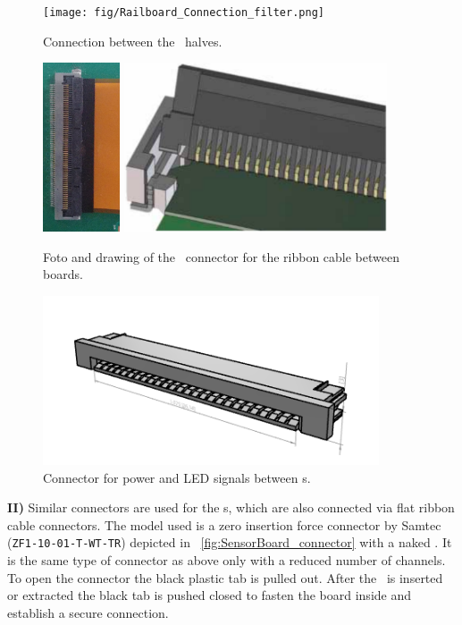 \documentclass[../BTOF_summary.tex]{subfiles}
\begin{document}
\begin{figure}[htbp]
	\centering
	\texttt{[image: fig/Railboard\_Connection\_filter.png]}
	\caption{Connection between the \railboard\ halves.}
	\label{fig:Railboard_connection}
\end{figure}

\begin{figure}[htbp]
	\centering
	\includegraphics[height=5cm]{fig/LargeConnector_cable_crop.jpg}
	\includegraphics[height=5cm]{fig/hirose_connector_drawing.png}
	\caption{Foto and drawing of the \railboard\ connector for the ribbon cable between boards.}
	\label{fig:Railboard_connector}
\end{figure}

\begin{figure}[htbp]
	\centering
	\includegraphics[height=5cm]{fig/Connector_ZF1-25-01.png}
	\caption{Connector for power and LED signals between \railboard s.}
	\label{fig:Railboard_power_connection}
\end{figure}

\textbf{II)} Similar connectors are used for the \sensorboard s, which are also connected via flat ribbon cable connectors.
The model used is a zero insertion force connector by Samtec (\texttt{ZF1-10-01-T-WT-TR}) depicted in \fig~\ref{fig:SensorBoard_connector} with a naked \sensorboard .
It is the same type of connector as above only with a reduced number of channels.
To open the connector the black plastic tab is pulled out.
After the \sensorboard\ is inserted or extracted the black tab is pushed closed to fasten the board inside and establish a secure connection.
\end{document}
